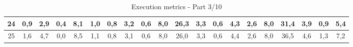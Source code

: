 \begin{sidewaystable}[]
\begin{tabular}{|c|c|c|c|c|c|c|c|c|c|c|c|c|c|c|c|c|c|c|c|}
    24 & 0,9                                             & 2,9                                             & 0,4                                             & 8,1                                              & 1,0                                              & 0,8                                              & 3,2                                              & 0,6                                              & 8,0                                              & 26,3                                             & 3,3                                              & 0,6                                              & 4,3                                              & 2,6                                              & 8,0                                              & 31,4                                             & 3,9                                              & 0,9                                              & 5,4                                              \\ \hline
    25 & 1,6                                             & 4,7                                             & 0,0                                             & 8,5                                              & 1,1                                              & 0,8                                              & 3,1                                              & 0,6                                              & 8,0                                              & 26,0                                             & 3,3                                              & 0,6                                              & 4,4                                              & 2,6                                              & 8,0                                              & 36,5                                             & 4,6                                              & 1,3                                              & 7,2                                              \\ \hline
    \end{tabular}
    \caption{Execution metrics - Part 3/10}
    \label{tab:ap:exec_metrics_3}
\end{sidewaystable}

